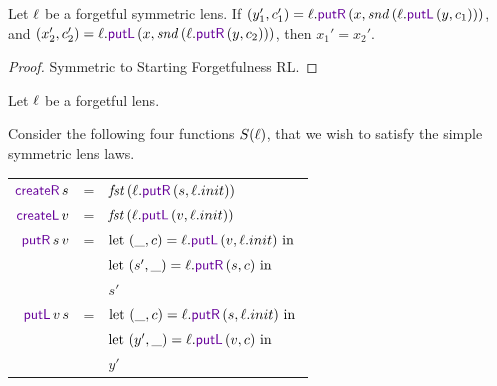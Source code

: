 \documentclass[acmsmall,screen,anonymous]{acmart}
\begin{document}
\begin{property}
  \label{prop:forget-lr}
  Let $\mathit{\ell}$ be a forgetful symmetric lens.  If $(y_1',c_1') = \Lens.\PutR \App
  (x,\Snd \App (\Lens.\PutL \App (y,c_1)))$, and
  $(x_2',c_2') = \Lens.\PutL \App
  (x,\Snd \App (\Lens.\PutR \App (y,c_2)))$,
  then $x_1' = x_2'$.
\end{property}
\begin{proof}
  Symmetric to Starting Forgetfulness RL.
\end{proof}

\begin{definition}[S]
  Let $\mathit{\ell}$ be a forgetful lens.

  Consider the following four functions $S(\mathit{\ell})$, that we wish to satisfy the
  simple symmetric lens laws.

  \begin{centering}
    \begin{tabular}{@{}r@{\ }c@{\ }l@{}}
      $\CreateR{} \App s$
      & =
      & $\Fst \App (\Lens.\PutR{} \App (s,\Lens.init))$\\
      
      $\CreateL{} \App v$
      & =
      & $\Fst \App (\Lens.\PutL{} \App (v,\Lens.init))$\\
      
      $\PutR{} \App s \App v$
      & =
      & $\LetIn{(\_,c)}{\Lens.\PutL \App (v,\Lens.init)}$\\
      &
      & $\LetIn{(s',\_)}{\Lens.\PutR \App (s,c)}$\\
      &
      & $s'$\\
      
      $\PutL{} \App v \App s$
      & =
      & $\LetIn{(\_,c)}{\Lens.\PutR \App (s,\Lens.init)}$\\
      &
      & $\LetIn{(y',\_)}{\Lens.\PutL \App (v,c)}$\\
      &
      & $y'$\\
    \end{tabular}
  \end{centering}
\end{definition}
\end{document}
